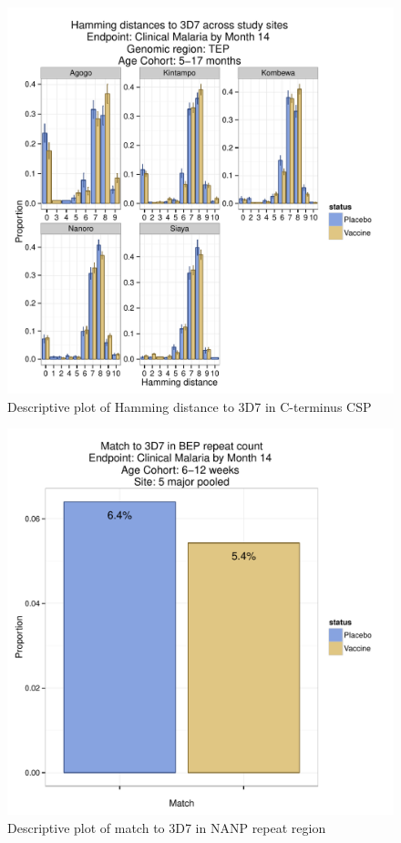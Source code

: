 \documentclass[]{article}
\begin{document}
\begin{figure}[htbp]
\centering
\includegraphics{figures/hamming-infant-sites-c-1.pdf}
\caption{Descriptive plot of Hamming distance to 3D7 in C-terminus CSP}
\end{figure}

\begin{figure}[htbp]
\centering
\includegraphics{figures/bep-match-newborn-c-1.pdf}
\caption{Descriptive plot of match to 3D7 in NANP repeat region}
\end{figure}
\end{document}
